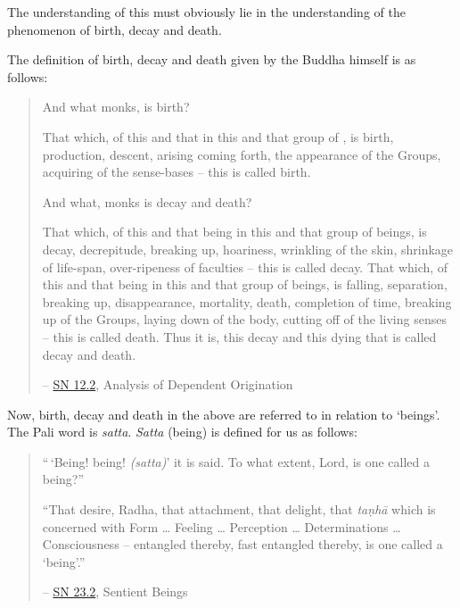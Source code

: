 The understanding of this must obviously lie in the understanding of the phenomenon of birth, decay and death.

The definition of birth, decay and death given by the Buddha himself is as follows:

\begin{quote}
And what monks, is birth?

That which, of this and that  in this and that group of , is birth, production, descent, arising coming forth, the appearance of the Groups, acquiring of the sense-bases -- this is called birth.

And what, monks is decay and death?

That which, of this and that being in this and that group of beings, is decay, decrepitude, breaking up, hoariness, wrinkling of the skin, shrinkage of life-span, over-ripeness of faculties -- this is called decay. That which, of this and that being in this and that group of beings, is falling, separation, breaking up, disappearance, mortality, death, completion of time, breaking up of the Groups, laying down of the body, cutting off of the living senses -- this is called death. Thus it is, this decay and this dying that is called decay and death.

 -- \href{https://suttacentral.net/sn12.2/en/bodhi}{SN 12.2}, Analysis of Dependent Origination
\end{quote}

Now, birth, decay and death in the above are referred to in relation to `beings'. The Pali word is \emph{satta}. \emph{Satta} (being) is defined for us as follows:

\begin{quote}
``\,`Being! being! \emph{(satta)}' it is said. To what extent, Lord, is one called a being?''

``That desire, Radha, that attachment, that delight, that \emph{taṇhā} which is concerned with Form \ldots\hspace{0pt} Feeling \ldots\hspace{0pt} Perception \ldots\hspace{0pt} Determinations \ldots\hspace{0pt} Consciousness -- entangled thereby, fast entangled thereby,  is one called a `being'.''

 -- \href{https://suttacentral.net/sn23.2/en/sujato}{SN 23.2}, Sentient Beings
\end{quote}

